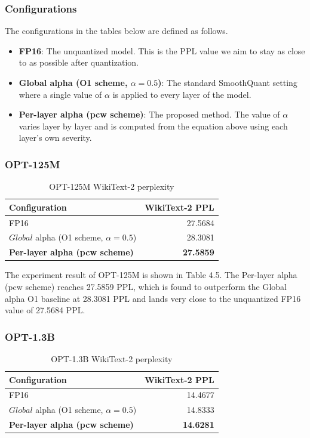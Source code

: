 \subsubsection*{Configurations}
The configurations in the tables below are defined as follows.
\begin{itemize}
    \item \textbf{FP16}: The unquantized model. This is the PPL value we aim to stay as close to as possible after quantization.
    \item \textbf{Global alpha (O1 scheme, $\alpha=0.5$)}: The standard SmoothQuant setting \cite{smoothquant_paper} where a single value of $\alpha$ is applied to every layer of the model.
    \item \textbf{Per-layer alpha (pcw scheme)}: The proposed method. The value of $\alpha$ varies layer by layer and is computed from the equation above using each layer's own severity.
\end{itemize}

\subsubsection*{OPT-125M}

\begin{table}[h]
\centering
\begin{threeparttable}
\caption{OPT-125M WikiText-2 perplexity}
\begin{tabular}{lr}
\hline
Configuration & WikiText-2 PPL \\
\hline
FP16 & 27.5684 \\
$Global$ alpha (O1 scheme, $\alpha=0.5$) & 28.3081 \\
\textbf{Per-layer alpha (pcw scheme)} & \textbf{27.5859} \\
\hline
\end{tabular}
\end{threeparttable}
\end{table}

The experiment result of OPT-125M is shown in Table 4.5. The Per-layer alpha (pcw scheme) reaches 27.5859 PPL, which is found to outperform the Global alpha O1 baseline at 28.3081 PPL and lands very close to the unquantized FP16 value of 27.5684 PPL.

\subsubsection*{OPT-1.3B}

\begin{table}[h]
\centering
\begin{threeparttable}
\caption{OPT-1.3B WikiText-2 perplexity}
\begin{tabular}{lr}
\hline
Configuration & WikiText-2 PPL \\
\hline
FP16 & 14.4677 \\
$Global$ alpha (O1 scheme, $\alpha=0.5$) & 14.8333 \\
\textbf{Per-layer alpha (pcw scheme)} & \textbf{14.6281} \\
\hline
\end{tabular}
\end{threeparttable}
\end{table}

